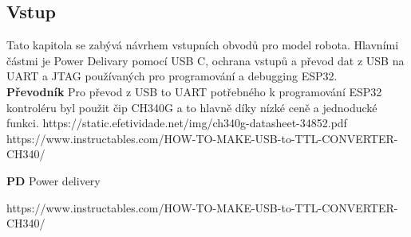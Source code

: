 \subsection{Vstup}
Tato kapitola se zabývá návrhem vstupních obvodů pro model robota. Hlavními částmi je Power Delivary pomocí USB C, ochrana vstupů a převod dat z USB na UART a JTAG používaných pro programování a debugging ESP32.\\

\textbf{Převodník}
Pro převod z USB to UART potřebného k programování ESP32 kontroléru byl použit čip CH340G a to hlavně díky nízké ceně a jednoducké funkci.
https://static.efetividade.net/img/ch340g-datasheet-34852.pdf
https://www.instructables.com/HOW-TO-MAKE-USB-to-TTL-CONVERTER-CH340/

\textbf{PD}
Power delivery

https://www.instructables.com/HOW-TO-MAKE-USB-to-TTL-CONVERTER-CH340/
